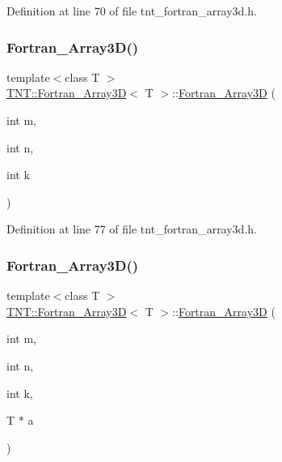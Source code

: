 Definition at line 70 of file tnt\+\_\+fortran\+\_\+array3d.\+h.

\mbox{\label{classTNT_1_1Fortran__Array3D_ae21aebe248a70f8aebb02019ca234018}} 
\subsubsection{\texorpdfstring{Fortran\+\_\+\+Array3\+D()}{Fortran\_Array3D()}\hspace{0.1cm}{\footnotesize\ttfamily [2/5]}}
{\footnotesize\ttfamily template$<$class T $>$ \\
\hyperlink{classTNT_1_1Fortran__Array3D}{T\+N\+T\+::\+Fortran\+\_\+\+Array3D}$<$ T $>$\+::\hyperlink{classTNT_1_1Fortran__Array3D}{Fortran\+\_\+\+Array3D} (\begin{DoxyParamCaption}\item[{int}]{m,  }\item[{int}]{n,  }\item[{int}]{k }\end{DoxyParamCaption})}



Definition at line 77 of file tnt\+\_\+fortran\+\_\+array3d.\+h.

\mbox{\label{classTNT_1_1Fortran__Array3D_afc769243d26ea77ee409b50b61ae8e6a}} 
\subsubsection{\texorpdfstring{Fortran\+\_\+\+Array3\+D()}{Fortran\_Array3D()}\hspace{0.1cm}{\footnotesize\ttfamily [3/5]}}
{\footnotesize\ttfamily template$<$class T $>$ \\
\hyperlink{classTNT_1_1Fortran__Array3D}{T\+N\+T\+::\+Fortran\+\_\+\+Array3D}$<$ T $>$\+::\hyperlink{classTNT_1_1Fortran__Array3D}{Fortran\+\_\+\+Array3D} (\begin{DoxyParamCaption}\item[{int}]{m,  }\item[{int}]{n,  }\item[{int}]{k,  }\item[{T $\ast$}]{a }\end{DoxyParamCaption})}



